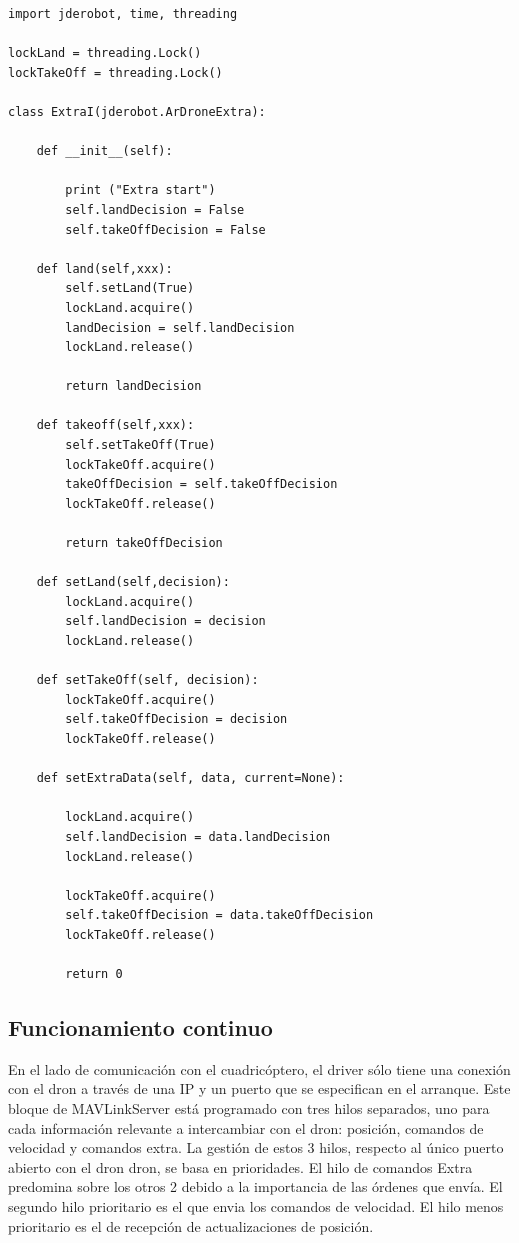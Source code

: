 \begin{lstlisting}[frame=single]
import jderobot, time, threading

lockLand = threading.Lock()
lockTakeOff = threading.Lock()

class ExtraI(jderobot.ArDroneExtra):

    def __init__(self):

        print ("Extra start")
        self.landDecision = False
        self.takeOffDecision = False

    def land(self,xxx):
        self.setLand(True)
        lockLand.acquire()
        landDecision = self.landDecision
        lockLand.release()

        return landDecision

    def takeoff(self,xxx):
        self.setTakeOff(True)
        lockTakeOff.acquire()
        takeOffDecision = self.takeOffDecision
        lockTakeOff.release()

        return takeOffDecision

    def setLand(self,decision):
        lockLand.acquire()
        self.landDecision = decision
        lockLand.release()

    def setTakeOff(self, decision):
        lockTakeOff.acquire()
        self.takeOffDecision = decision
        lockTakeOff.release()

    def setExtraData(self, data, current=None):

        lockLand.acquire()
        self.landDecision = data.landDecision
        lockLand.release()

        lockTakeOff.acquire()
        self.takeOffDecision = data.takeOffDecision
        lockTakeOff.release()

        return 0

\end{lstlisting}  

\subsection{Funcionamiento continuo}

En el lado de comunicación con el cuadricóptero, el driver sólo tiene una conexión con el dron a través de una IP y un puerto que se especifican en el arranque. Este bloque de MAVLinkServer está programado con tres hilos separados, uno para cada información relevante a intercambiar con el dron: posición, comandos de velocidad y comandos extra. La gestión de estos 3 hilos, respecto al único puerto abierto con el dron dron, se basa en prioridades. El hilo de comandos Extra predomina sobre los otros 2 debido a la importancia de las órdenes que envía. El segundo hilo prioritario es el que envia los comandos de velocidad. El hilo menos prioritario es el de recepción de actualizaciones de posición. 

